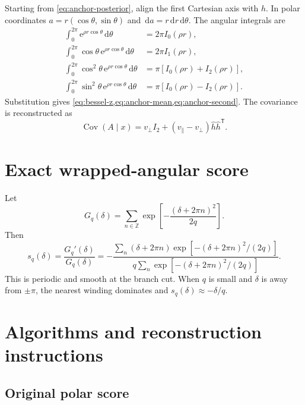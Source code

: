 \documentclass[11pt,a4paper]{article}
\newcommand{\Cov}{\operatorname{Cov}}
\newcommand{\dd}{\,\mathrm d}
\newcommand{\e}{\mathrm e}
\begin{document}
Starting from \cref{eq:anchor-posterior}, align the first Cartesian axis with $h$. In polar coordinates $a=r(\cos\theta,\sin\theta)$ and $\dd a=r\dd r\dd\theta$. The angular integrals are
\begin{align}
 \int_0^{2\pi}\e^{\rho r\cos\theta}\dd\theta&=2\pi I_0(\rho r),\\
 \int_0^{2\pi}\cos\theta\,\e^{\rho r\cos\theta}\dd\theta&=2\pi I_1(\rho r),\\
 \int_0^{2\pi}\cos^2\theta\,\e^{\rho r\cos\theta}\dd\theta
 &=\pi[I_0(\rho r)+I_2(\rho r)],\\
 \int_0^{2\pi}\sin^2\theta\,\e^{\rho r\cos\theta}\dd\theta
 &=\pi[I_0(\rho r)-I_2(\rho r)].
\end{align}
Substitution gives \cref{eq:bessel-z,eq:anchor-mean,eq:anchor-second}. The covariance is reconstructed as
\begin{equation}
 \Cov(A\mid x)
 =v_\perp I_2+(v_\parallel-v_\perp)\widehat h\widehat h^\mathsf{T}.
\end{equation}

\section{Exact wrapped-angular score}

Let
\[
 G_q(\delta)=\sum_{n\in\mathbb Z}
 \exp\left[-\frac{(\delta+2\pi n)^2}{2q}\right].
\]
Then
\begin{equation}
 s_q(\delta)=\frac{G_q'(\delta)}{G_q(\delta)}
 =-\frac{\sum_n(\delta+2\pi n)
 \exp[-(\delta+2\pi n)^2/(2q)]}
 {q\sum_n\exp[-(\delta+2\pi n)^2/(2q)]}.
\end{equation}
This is periodic and smooth at the branch cut. When $q$ is small and $\delta$ is away from $\pm\pi$, the nearest winding dominates and $s_q(\delta)\approx-\delta/q$.

\section{Algorithms and reconstruction instructions}

\subsection{Original polar score}
\end{document}
